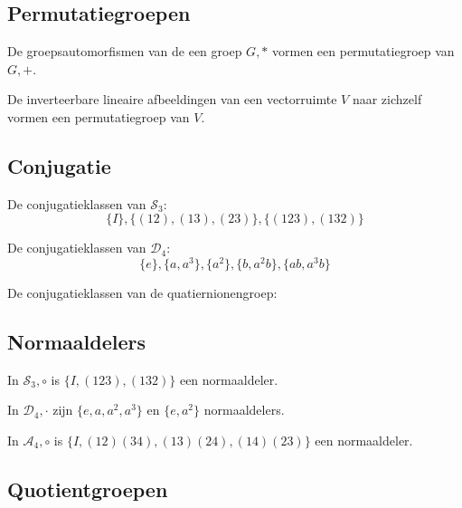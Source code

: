 \documentclass[main.tex]{subfiles}
\begin{document}
\subsection{Permutatiegroepen}


\begin{vb}
  De groepsautomorfismen van de een groep $G,*$ vormen een permutatiegroep van $G,+$.
\end{vb}

\begin{vb}
  De inverteerbare lineaire afbeeldingen van een vectorruimte $V$ naar zichzelf vormen een permutatiegroep van $V$.
\end{vb}

\subsection{Conjugatie}


\begin{vb}
  De conjugatieklassen van $\mathcal{S}_{3}$:
  \[ \{I\}, \{(12),(13),(23)\}, \{(123),(132)\} \]
\end{vb}

\begin{vb}
  De conjugatieklassen van $\mathcal{D_{4}}$:
  \[ \{e\}, \{a,a^{3}\}, \{a^{2}\}, \{b,a^{2}b\}, \{ab,a^{3}b\} \]
\end{vb}

\begin{vb}
  De conjugatieklassen van de quatiernionengroep:
\end{vb}


\subsection{Normaaldelers}
\begin{vb}
  In $\mathcal{S}_{3},\circ$ is $\{I,(123),(132)\}$ een normaaldeler.
\end{vb}

\begin{vb}
  In $\mathcal{D}_{4},\cdot$ zijn $\{e,a,a^{2},a^{3}\}$ en $\{e,a^{2}\}$ normaaldelers.
\end{vb}

\begin{vb}
  In $\mathcal{A}_{4},\circ$ is $\{I,(12)(34),(13)(24),(14)(23)\}$ een normaaldeler.
\end{vb}

\subsection{Quotientgroepen}
\end{document}
